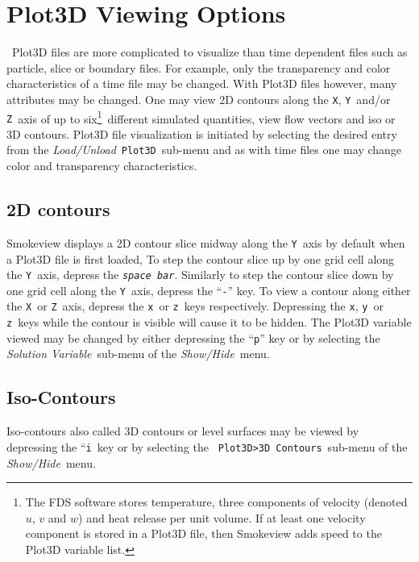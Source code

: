 \documentclass[11pt,twoside]{book}
\begin{document}
\section{Plot3D Viewing Options}\ Plot3D files are more
complicated to visualize than time dependent files such as
particle, slice or boundary files. For example, only the
transparency and color characteristics of a time file may be
changed. With Plot3D files however, many attributes may be
changed. One may view 2D contours along the {\tt X}, {\tt Y}\
and/or {\tt Z}\ axis of up to six\footnote{ The FDS software stores
temperature, three components of velocity (denoted $u$, $v$ and
$w$) and heat release per unit volume.  If at least one velocity
component is stored in a Plot3D file, then Smokeview adds speed to
the Plot3D variable list.}\ different simulated quantities, view
flow vectors and iso or 3D contours. Plot3D file visualization is
initiated by selecting the desired entry from the {\em
Load/Unload}\ {\tt Plot3D}\ sub-menu and as with time files one may
change color and transparency characteristics.

\subsection{2D contours}
Smokeview displays a 2D contour slice midway along the {\tt Y}\
axis by default when a Plot3D file is first loaded, To step the
contour slice up by one grid cell along the {\tt Y}\ axis, depress
the {\em\tt space bar}. Similarly to step the contour slice down
by one grid cell along the {\tt Y}\ axis, depress the ``{\tt -}''
key. To view a contour along either the {\tt X}\ or {\tt Z}\ axis,
depress the {\tt x}\ or {\tt z}\ keys respectively.  Depressing the
{\tt x}, {\tt y}\ or {\tt z}\ keys while the contour is visible will
cause it to be hidden. The Plot3D variable viewed may be changed
by either depressing the ``{\tt p}'' key or by selecting the {\em
Solution Variable}\ sub-menu of the {\em Show/Hide}\ menu.

\subsection{Iso-Contours}Iso-contours also called 3D contours or level surfaces may be
viewed by depressing the ``{\tt i}\ key or by selecting the {\tt
Plot3D>3D Contours}\ sub-menu of the {\em Show/Hide}\ menu.
\end{document}
